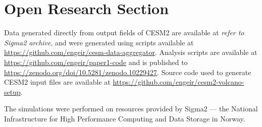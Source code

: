 \documentclass[draft]{agujournal2019}
\begin{document}
%
%

\section*{Open Research Section}


Data generated directly from output fields of CESM2 are available at \emph{refer to
  Sigma2 archive}, and were generated using scripts available at
\url{https://github.com/engeir/cesm-data-aggregator}. Analysis scripts are available at
\url{https://github.com/engeir/paper1-code} and is published to
\url{https://zenodo.org/doi/10.5281/zenodo.10229427}. Source code used to generate CESM2
input files are available at \url{https://github.com/engeir/cesm2-volcano-setup}.







\acknowledgments


The simulations were performed on resources provided by Sigma2 --- the National
Infrastructure for High Performance Computing and Data Storage in Norway.

%
%


\end{document}
